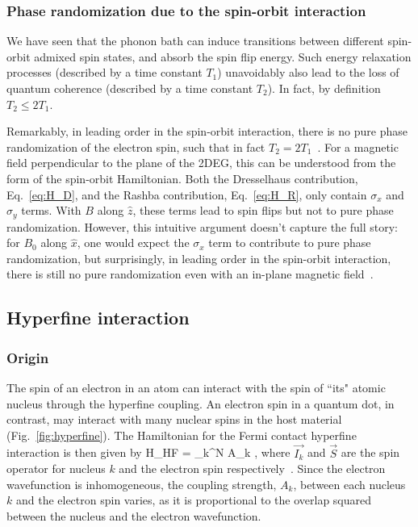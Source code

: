 \documentclass[rmp,twocolumn,aps]{revtex4}
\begin{document}

\subsubsection{Phase randomization due to the spin-orbit interaction}

We have seen that the phonon bath can induce transitions between
different spin-orbit admixed spin states, and absorb the spin flip
energy. Such energy relaxation processes (described by a time constant $T_1$) unavoidably also lead to the loss of quantum coherence
(described by a time constant $T_2$). In fact, by definition $T_2
\le 2 T_1$.

Remarkably, in leading order in the spin-orbit interaction, there
is no pure phase randomization of the electron spin, such that in
fact $T_2 = 2 T_1$~\cite{golovach04}. For a magnetic field
perpendicular to the plane of the 2DEG, this can be understood
from the form of the spin-orbit Hamiltonian. Both the Dresselhaus
contribution, Eq.~\ref{eq:H_D}, and the Rashba contribution,
Eq.~\ref{eq:H_R}, only contain $\sigma_x$ and $\sigma_y$ terms.
With $B$ along $\hat{z}$, these terms lead to spin flips but not
to pure phase randomization. However, this intuitive argument doesn't capture the full story:
for $B_0$ along $\hat{x}$, one
would expect the $\sigma_x$ term to contribute to pure phase
randomization, but surprisingly, in leading order in the spin-orbit
interaction, there is still no pure randomization even with an
in-plane magnetic field~\cite{golovach04}.



\subsection{Hyperfine interaction}
\label{Section:Hyperfine}
\subsubsection{Origin}

The spin of an electron in an atom can interact with the spin of
``its" atomic nucleus through the hyperfine coupling. An electron
spin in a quantum dot, in contrast, may interact with many nuclear
spins in the host material (Fig.~\ref{fig:hyperfine}). The Hamiltonian for the Fermi contact hyperfine interaction is then given by 
\be 
{\cal H}_{HF} = \sum_k^N A_k   \;, 
\label{eq:H_HF} 
\ee
where $\vec{I_k}$ and $\vec{S}$ are the spin operator for nucleus
$k$ and the electron spin respectively~\cite{Abragam,Slichter,Abragam-Bleaney,BookOptical}. Since the electron wavefunction is inhomogeneous, the coupling strength, $A_k$, between each nucleus $k$ and the electron spin varies, as it is proportional to the overlap squared between the nucleus and the electron wavefunction.  
\end{document}
